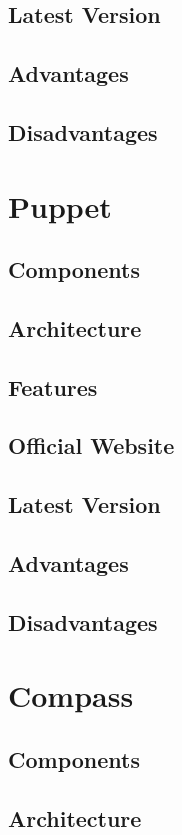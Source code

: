 \documentclass[a4paper, 12pt]{article}
\begin{document}
\subsection{Latest Version}
\subsection{Advantages}
\subsection{Disadvantages}

\newpage
\section{Puppet}
\subsection{Components}
\subsection{Architecture}
\subsection{Features}
\subsection{Official Website}
\subsection{Latest Version}
\subsection{Advantages}
\subsection{Disadvantages}

\newpage
\section{Compass}
\subsection{Components}
\subsection{Architecture}
\end{document}
